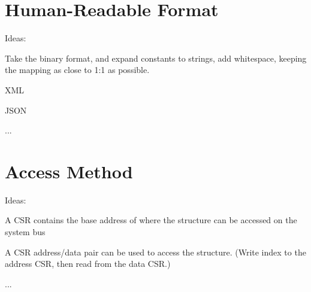 \chapter{Human-Readable Format}

\begin{steps}{Ideas:}
\item Take the binary format, and expand constants to strings, add whitespace,
keeping the mapping as close to 1:1 as possible.
\item XML
\item JSON
\item ...
\end{steps}

\chapter{Access Method}
\label{sec:AccessMethod}

\begin{steps}{Ideas:}
\item A CSR contains the base address of where the structure can be accessed on
the system bus
\item A CSR address/data pair can be used to access the structure. (Write index
to the address CSR, then read from the data CSR.)
\item ...
\end{steps}
